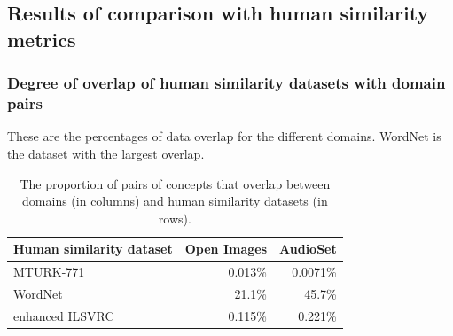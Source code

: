 \subsection{Results of comparison with human similarity metrics}

\subsubsection{Degree of overlap of human similarity datasets with domain pairs}

These are the percentages of data overlap for the different domains. WordNet is the dataset with the largest overlap. 

\begin{table}[H]
\centering
\begin{tabular}{lrr}
\toprule
{Human similarity dataset} &  Open Images &   AudioSet\\
\midrule
MTURK-771    &     0.013\% &  0.0071\%  \\
WordNet    &     21.1\% &  45.7\%  \\
enhanced ILSVRC    &    0.115\% &  0.221\% \\
\bottomrule
\end{tabular}
\caption{The proportion of pairs of concepts that overlap between domains (in columns) and human similarity datasets (in rows).}
\end{table}

